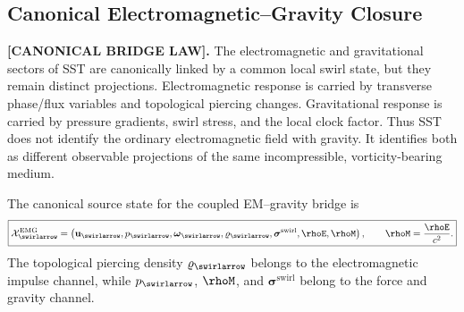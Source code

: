 
    \subsection{Canonical Electromagnetic--Gravity Closure}
        \label{subsec:canonical_em_gravity_closure}

        \textbf{[CANONICAL BRIDGE LAW].} The electromagnetic and gravitational sectors of SST are canonically linked by a common local swirl state, but they remain distinct projections. Electromagnetic response is carried by transverse phase/flux variables and topological piercing changes. Gravitational response is carried by pressure gradients, swirl stress, and the local clock factor. Thus SST does not identify the ordinary electromagnetic field with gravity. It identifies both as different observable projections of the same incompressible, vorticity-bearing medium.

        The canonical source state for the coupled EM--gravity bridge is
        \begin{align}
            \boxed{
            \mathcal{X}^{\mathrm{EMG}}_{\swirlarrow}
            =
            \left(
            \mathbf{u}_{\swirlarrow},
            p_{\swirlarrow},
            \boldsymbol{\omega}_{\swirlarrow},
            \varrho_{\swirlarrow},
            \boldsymbol{\sigma}^{\mathrm{swirl}},
            \rhoE,
            \rhoM
            \right),
            \qquad
            \rhoM=\frac{\rhoE}{c^2}.
            }
            \label{eq:emg_source_state}
        \end{align}
        The topological piercing density \(\varrho_{\swirlarrow}\) belongs to the electromagnetic impulse channel, while \(p_{\swirlarrow}\), \(\rhoM\), and \(\boldsymbol{\sigma}^{\mathrm{swirl}}\) belong to the force and gravity channel.

